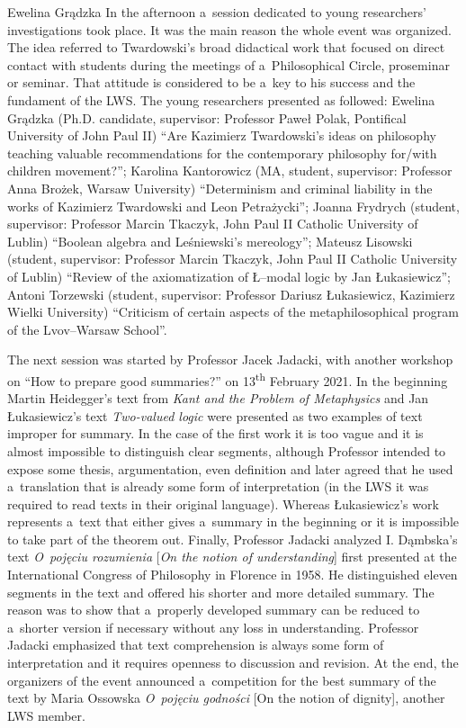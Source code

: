 \begin{editorialeng}{Ewelina Grądzka}
In the afternoon a~session dedicated to young researchers’ investigations took place. It was the main reason the whole event was organized. The idea referred to Twardowski’s broad didactical work that focused on direct contact with students during the meetings of a~Philosophical Circle, proseminar or seminar. That attitude is considered to be a~key to his success and the fundament of the LWS. The young researchers presented as followed: Ewelina Grądzka (Ph.D. candidate, supervisor: Professor Paweł Polak, Pontifical University of John Paul II) ``Are Kazimierz Twardowski’s ideas on philosophy teaching valuable recommendations for the contemporary philosophy for/with children movement?''; Karolina Kantorowicz (MA, student, supervisor: Professor Anna Brożek, Warsaw University) ``Determinism and criminal liability in the works of Kazimierz Twardowski and Leon Petrażycki''; Joanna Frydrych (student, supervisor: Professor Marcin Tkaczyk, John Paul II Catholic University of Lublin) ``Boolean algebra and Leśniewski’s mereology''; Mateusz Lisowski (student, supervisor: Professor Marcin Tkaczyk, John Paul II Catholic University of Lublin) ``Review of the axiomatization of Ł--modal logic by Jan Łukasiewicz''; Antoni Torzewski (student, supervisor: Professor Dariusz Łukasiewicz, Kazimierz Wielki University) ``Criticism of certain aspects of the metaphilosophical program of the Lvov--Warsaw School''.

The next session was started by Professor Jacek Jadacki, with another workshop on ``How to prepare good summaries?'' on 13\textsuperscript{th} February 2021. In the beginning Martin Heidegger’s text from \textit{Kant and the Problem of Metaphysics} and Jan Łukasiewicz’s text \textit{Two-valued logic} were presented as two examples of text improper for summary. In the case of the first work it is too vague and it is almost impossible to distinguish clear segments, although Professor intended to expose some thesis, argumentation, even definition and later agreed that he used a~translation that is already some form of interpretation (in the LWS it was required to read texts in their original language). Whereas Łukasiewicz’s work represents a~text that either gives a~summary in the beginning or it is impossible to take part of the theorem out. Finally, Professor Jadacki analyzed I. Dąmbska’s text \textit{O~pojęciu rozumienia} [\textit{On the notion of understanding}]
\parencite[][]{dambska_notion_2016} %
 first presented at the International Congress of Philosophy in Florence in 1958. He distinguished eleven segments in the text and offered his shorter and more detailed summary. The reason was to show that a~properly developed summary can be reduced to a~shorter version if necessary without any loss in understanding. Professor Jadacki emphasized that text comprehension is always some form of interpretation and it requires openness to discussion and revision. At the end, the organizers of the event announced a~competition for the best summary of the text by Maria Ossowska \textit{O~pojęciu godności} [On the notion of dignity], another LWS member.


\end{editorialeng}
